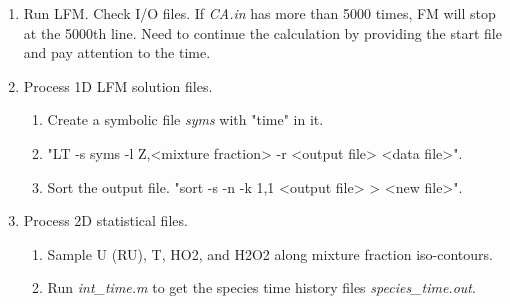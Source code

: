 \documentclass[11pt,english]{article}
\begin{document}
\begin{enumerate}
\begin{enumerate}
  \end{enumerate}  
  \item Run LFM.  Check I/O files.  If \emph{CA.in} has more than 5000 times, FM will stop at the 5000th line.  Need to continue the calculation by providing the start file and pay attention to the time.
  \item Process 1D LFM solution files.
  \begin{enumerate}
    \item Create a symbolic file \emph{syms} with "time" in it.
    \item "LT -s syms -l Z,<mixture fraction> -r <output file> <data file>".
    \item Sort the output file.  "sort -s -n -k 1,1 <output file> > <new file>".
  \end{enumerate} 
  \item Process 2D statistical files.
  \begin{enumerate}
    \item Sample U (RU), T, HO2, and H2O2 along mixture fraction iso-contours.
    \item Run \emph{int\_time.m} to get the species time history files \emph{species\_time.out}.
  \end{enumerate} 
\end{enumerate}
\end{document}
